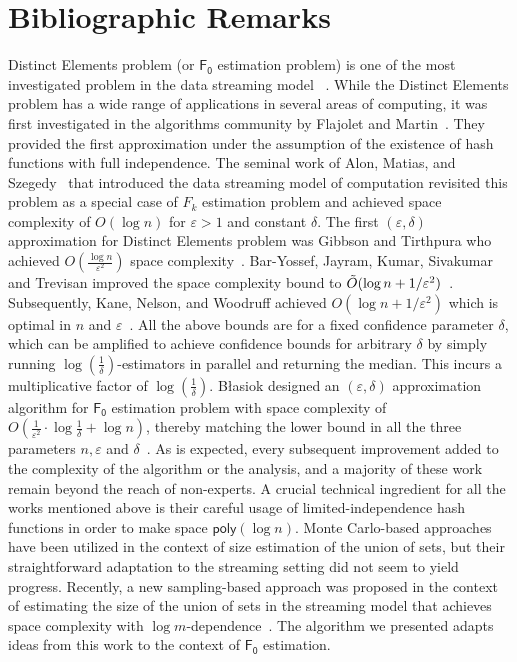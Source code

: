 \documentclass[a4paper,UKenglish,cleveref, autoref, thm-restate]{lipics-v2021}
\newcommand{\Fo}{\ensuremath{\mathsf{F_0}}}
\newcommand{\poly}{\ensuremath{\mathsf{poly}}}
\begin{document}
\section{Bibliographic Remarks}\label{sec:related}



Distinct Elements problem (or $\Fo$ estimation problem) is one of the most investigated  problem in the data streaming model ~\cite{AMS99,BJKST02,BKS02,Blasiok18,BC09,DF03,CVF03,FFGM07, FM85,GT01,IW03,KNW10}. While the Distinct Elements problem has a wide range of applications in several areas of computing, it was first investigated in the algorithms community by Flajolet and Martin~\cite{FM85}. They provided the first approximation under the assumption of the existence of hash functions with full independence. The seminal work of Alon, Matias, and Szegedy~\cite{AMS99} that introduced the data streaming model of computation revisited this problem as a special case of $F_k$ estimation problem and achieved space complexity of $O(\log n)$ for $\varepsilon > 1$ and constant $\delta$. The first $(\varepsilon,\delta)$ approximation for Distinct Elements problem was Gibbson and Tirthpura who achieved $O(\frac{\log n}{\varepsilon^2})$ space complexity~\cite{GT01}. Bar-Yossef, Jayram, Kumar, Sivakumar and Trevisan improved the space complexity bound to $\Tilde{O}(\log n + 1/\varepsilon^2)$~\cite{BJKST02}. Subsequently, Kane, Nelson, and Woodruff achieved $O(\log n + 1/\varepsilon^2)$ which is optimal in $n$ and $\varepsilon$~\cite{KNW10}. All the above bounds are for a fixed confidence parameter $\delta$, which can be amplified to achieve confidence bounds for arbitrary $\delta$ by simply running $\log (\frac{1}{\delta})$-estimators in parallel and returning the median. This incurs a multiplicative factor of $\log (\frac{1}{\delta})$. B\l{}asiok designed an $(\varepsilon,\delta)$ approximation algorithm for $\Fo$ estimation problem with space complexity of $O(\frac{1}{\varepsilon^2}\cdot\log \frac{1}{\delta} + \log n)$, thereby matching the lower bound in all the three parameters $n,\varepsilon$ and $\delta$~\cite{Blasiok18}. As is expected, every subsequent improvement added to the complexity of the algorithm or the analysis, and a majority of these work remain beyond the reach of non-experts. A crucial technical ingredient for all the works mentioned above is their careful usage of limited-independence hash functions in order to make space $\poly(\log n)$. Monte Carlo-based approaches have been utilized in the context of size estimation of the union of sets, but their straightforward adaptation to the streaming setting did not seem to yield progress. Recently, a new sampling-based approach was proposed in the context of estimating the size of the union of sets in the streaming model that achieves space complexity with $\log m$-dependence~\cite{MVC21}. The algorithm we presented adapts ideas from this work to the context of $\Fo$ estimation.  
\end{document}
